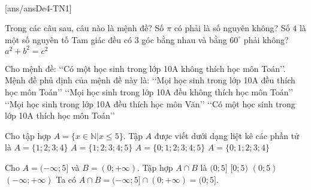﻿﻿\begin{name}
	{\tenchude}
	{\tendethi}
	{\tentruong}
	{\thoigian}
\end{name}
\setcounter{ex}{0}\setcounter{bt}{0}
\TN
{}[ans/ansDe4-TN1]
\begin{ex}%
	Trong các câu sau, câu nào là mệnh đề?
	\choice
	{Số $\pi $ có phải là số nguyên không?}
	{\True Số $4 $ là một số nguyên tố}
	{Tam giác đều  có $3$ góc bằng nhau và bằng $60^\circ$ phải không?}
	{$a^2+b^2=c^2 $}
\end{ex}

\begin{ex}%
	Cho mệnh đề: \lq\lq  Có một học sinh trong lớp 10A không thích học môn Toán\rq\rq. Mệnh đề phủ định của mệnh đề này là:
	\choice
	{\True \lq\lq  Mọi học sinh trong lớp 10A đều thích học môn Toán\rq\rq}
	{\lq\lq  Mọi học sinh trong lớp 10A đều không thích học môn Toán\rq\rq}
	{\lq\lq  Mọi học sinh trong lớp 10A đều thích học môn Văn\rq\rq}
	{\lq\lq  Có một học sinh trong lớp 10A thích học môn Toán\rq\rq}
\end{ex}

\begin{ex}%
	Cho tập hợp $A=\{x\in \mathbb{N}|x\leq 5\}$. Tập $A$ được viết dưới dạng liệt kê các phần tử là
	\choice
	{$A=\{1;2;3;4\}$}
	{$A=\{1;2;3;4;5\}$}
	{\True $A=\{0;1;2;3;4;5\}$}
	{$A=\{0;1;2;3;4\}$}
\end{ex}

\begin{ex}%
	Cho $A=(-\infty;5]$ và $B=(0;+\infty)$. Tập hợp $A\cap B$ là
	\choice
	{\True $(0;5]$}
	{$[0;5)$}
	{$(0;5)$}
	{$(-\infty;+\infty)$}
	\loigiai
	{
		Ta có $A\cap B = (-\infty;5]\cap (0;+\infty) = (0;5]$.
	}
\end{ex}

